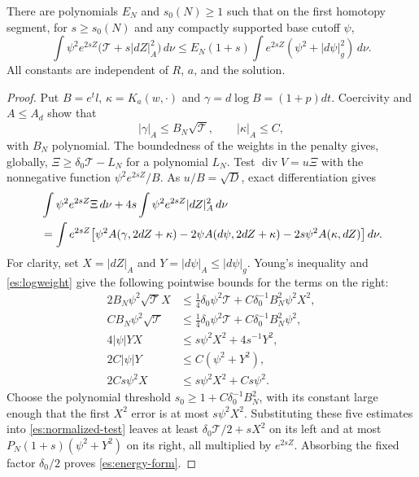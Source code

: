 \begin{lemma}\label{es:energy}
There are polynomials $E_N$ and $s_0(N)\ge1$ such that on the first
homotopy segment, for $s\ge s_0(N)$ and any compactly supported base
cutoff $\psi$,
\begin{equation}\label{es:energy-form}
 \int\psi^2e^{2sZ}\bigl(\mathcal T+s|dZ|_A^2\bigr)\,d\nu
 \le E_N(1+s)\int e^{2sZ}
                     (\psi^2+|d\psi|_g^2)\,d\nu.
\end{equation}
All constants are independent of $R$, $a$, and the solution.
\end{lemma}

\begin{proof}
Put $B=e^t l$, $\kappa=K_a(w,\cdot)$ and
$\gamma=d\log B=(1+p)dt$.  Coercivity and $A\le A_d$ show that
\begin{equation}\label{es:logweight}
 |\gamma|_A\le B_N\sqrt{\mathcal T},\qquad
 |\kappa|_A\le C,
\end{equation}
with $B_N$ polynomial.  The boundedness of the weights in the
penalty gives, globally,
$\Xi\ge\delta_0\mathcal T-L_N$ for a polynomial $L_N$.
Test $\operatorname{div}V=u\Xi$ with the nonnegative function
$\psi^2e^{2sZ}/B$.  As $u/B=\sqrt D$, exact differentiation gives
\begin{align}
 &\int\psi^2e^{2sZ}\Xi\,d\nu
       +4s\int\psi^2e^{2sZ}|dZ|_A^2\,d\nu\notag\\
 &=\int e^{2sZ}\bigl[
       \psi^2 A(\gamma,2dZ+\kappa)
       -2\psi A(d\psi,2dZ+\kappa)
       -2s\psi^2A(\kappa,dZ)\bigr]\,d\nu.             \label{es:normalized-test}
\end{align}
For clarity, set $X=|dZ|_A$ and $Y=|d\psi|_A\le|d\psi|_g$.
Young's inequality and \eqref{es:logweight} give the following
pointwise bounds for the terms on the right:
\begin{align*}
 2B_N\psi^2\sqrt{\mathcal T}X
     &\le\tfrac14\delta_0\psi^2\mathcal T
                         +C\delta_0^{-1}B_N^2\psi^2X^2,\\
 C B_N\psi^2\sqrt{\mathcal T}
     &\le\tfrac14\delta_0\psi^2\mathcal T
                         +C\delta_0^{-1}B_N^2\psi^2,\\
 4|\psi|YX&\le s\psi^2X^2+4s^{-1}Y^2,\\
 2C|\psi|Y&\le C(\psi^2+Y^2),\\
 2Cs\psi^2X&\le s\psi^2X^2+C s\psi^2.
\end{align*}
Choose the polynomial threshold
$s_0\ge1+C\delta_0^{-1}B_N^2$, with its constant large enough
that the first $X^2$ error is at most $s\psi^2X^2$.
Substituting these five estimates into
\eqref{es:normalized-test} leaves at least
$\delta_0\mathcal T/2+sX^2$ on its left and at most
$P_N(1+s)(\psi^2+Y^2)$ on its right, all multiplied by
$e^{2sZ}$.  Absorbing the fixed factor $\delta_0/2$ proves
\eqref{es:energy-form}.
\end{proof}


